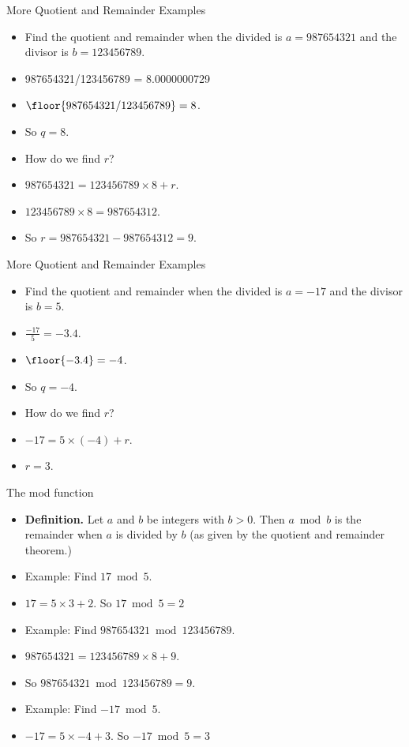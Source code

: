 \documentclass[handout]{beamer}
\begin{document}
\begin{frame}{More Quotient and Remainder Examples}

\begin{itemize}
  \item Find the quotient and remainder when the divided is $a=987654321$
  and the divisor is $b=123456789$.
  \item  987654321/123456789 = 8.0000000729
  \item $\floor{987654321/123456789} = 8$.
  \item So $q=8$.
  \item How do we find $r$?
  \item $987654321 = 123456789 \times 8 + r$.
  \item $123456789 \times 8 = 987654312$.
  \item So $r=987654321 - 987654312 = 9$.
\end{itemize}

\end{frame}

\begin{frame}{More Quotient and Remainder Examples}

\begin{itemize}
  \item Find the quotient and remainder when the divided is $a=-17$
  and the divisor is $b=5$.
  \item $\frac{-17}{5} = -3.4$.
  \item $\floor{-3.4} = -4$.
  \item So $q=-4$.
  \item How do we find $r$?
  \item $-17 = 5 \times (-4) + r$.
  \item $r=3$.
\end{itemize}

\end{frame}

\begin{frame}{The mod function}

\begin{itemize}
 \item \textbf{Definition.} Let $a$ and $b$ be integers with $b>0$.
 Then $a\bmod b$ is the remainder when $a$ is divided by $b$
 (as given by the quotient and remainder theorem.)
 \item Example: Find $17 \bmod 5$.
 \item $17 = 5 \times 3 + 2$. So $17 \bmod 5 = 2$
 \item Example: Find $987654321 \bmod 123456789$.
 \item $987654321 = 123456789 \times 8 + 9$.
 \item So $987654321 \bmod 123456789 = 9$.
 \item Example: Find $-17 \bmod 5$.
 \item $-17 = 5 \times -4 + 3$. So $-17 \bmod 5 = 3$
\end{itemize}

\end{frame}
\end{document}
